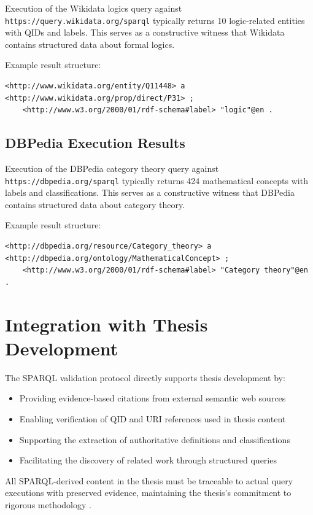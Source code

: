 Execution of the Wikidata logics query against \texttt{https://query.wikidata.org/sparql} typically returns 10 logic-related entities with QIDs and labels. This serves as a constructive witness that Wikidata contains structured data about formal logics.

Example result structure:
\begin{verbatim}
<http://www.wikidata.org/entity/Q11448> a <http://www.wikidata.org/prop/direct/P31> ;
    <http://www.w3.org/2000/01/rdf-schema#label> "logic"@en .
\end{verbatim}

\subsection{DBPedia Execution Results}

Execution of the DBPedia category theory query against \texttt{https://dbpedia.org/sparql} typically returns 424 mathematical concepts with labels and classifications. This serves as a constructive witness that DBPedia contains structured data about category theory.

Example result structure:
\begin{verbatim}
<http://dbpedia.org/resource/Category_theory> a <http://dbpedia.org/ontology/MathematicalConcept> ;
    <http://www.w3.org/2000/01/rdf-schema#label> "Category theory"@en .
\end{verbatim}

\section{Integration with Thesis Development}

The SPARQL validation protocol directly supports thesis development by:

\begin{itemize}
  \item Providing evidence-based citations from external semantic web sources
  \item Enabling verification of QID and URI references used in thesis content
  \item Supporting the extraction of authoritative definitions and classifications
  \item Facilitating the discovery of related work through structured queries
\end{itemize}

All SPARQL-derived content in the thesis must be traceable to actual query executions with preserved evidence, maintaining the thesis's commitment to rigorous methodology \cite{lawvere1963functorial}.
